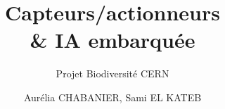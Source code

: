 \title{Capteurs/actionneurs \\ \& IA embarquée}
\subtitle{Projet Biodiversité CERN}
\author{Aurélia CHABANIER, Sami EL KATEB}
\date{\monthyeardate}
